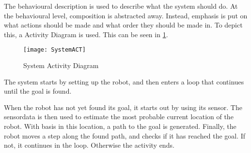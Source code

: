 \documentclass[Main]{subfiles}
\begin{document}
		The behavioural description is used to describe what the system should do.
		At the behavioural level, composition is abstracted away. 
		Instead, emphasis is put on what actions should be made and what order they should be made in.
		To depict this, a Activity Diagram is used. This can be seen in \ref{fig:systemact}.
		
		\begin{figure}[H]
			\centering
			\texttt{[image: SystemACT]}
			\caption{System Activity Diagram}
			\label{fig:systemact}
		\end{figure}
		
		The system starts by setting up the robot, and then enters a loop that continues until the goal is found.
		
		When the robot has not yet found its goal, it starts out by using its sensor.
		The sensordata is then used to estimate the most probable current location of the robot.
		With basis in this location, a path to the goal is generated.
		Finally, the robot moves a step along the found path, and checks if it has reached the goal.
		If not, it continues in the loop. Otherwise the activity ends.


\end{document}

